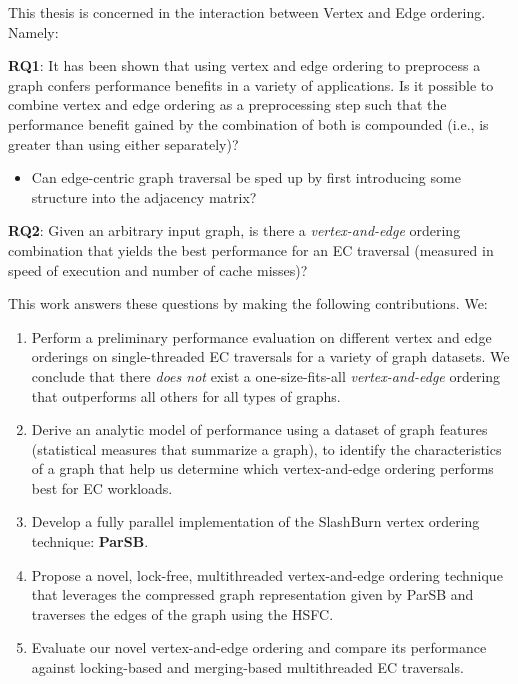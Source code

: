 This thesis is concerned in the interaction between Vertex and Edge ordering. Namely:

\textbf{RQ1}: It has been shown that using vertex and edge ordering to preprocess a graph confers performance benefits in a variety of applications. Is it possible to combine vertex
and edge ordering as a preprocessing step such that the performance benefit gained by the combination of both is compounded (i.e., is greater than using either separately)?
\begin{itemize}
  \item Can edge-centric graph traversal be sped up by first introducing some structure into the adjacency matrix?
\end{itemize}

\textbf{RQ2}: Given an arbitrary input graph, is there a \textit{vertex-and-edge} ordering combination that yields the best performance for an \ac{EC} traversal (measured in speed of execution and number of cache misses)?

This work answers these questions by making the following contributions. We:

\begin{enumerate}
  \item {Perform a preliminary performance evaluation on different vertex and edge orderings on single-threaded \ac{EC} traversals for a variety of graph datasets. We conclude that there \textit{does not} exist a one-size-fits-all \textit{vertex-and-edge} ordering that outperforms all others for all types of graphs.}
  \item {Derive an analytic model of performance using a dataset of graph features (statistical measures that summarize a graph), to identify the characteristics of a graph that help us determine which vertex-and-edge ordering performs best for \ac{EC} workloads.}
  \item {Develop a fully parallel implementation of the SlashBurn vertex ordering technique: \textbf{ParSB}.}
  \item {Propose a novel, lock-free, multithreaded vertex-and-edge ordering technique that leverages the compressed graph representation given by ParSB and traverses the edges of the graph using the \ac{HSFC}.}
  \item {Evaluate our novel vertex-and-edge ordering and compare its performance against locking-based and merging-based multithreaded \ac{EC} traversals.}
\end{enumerate}